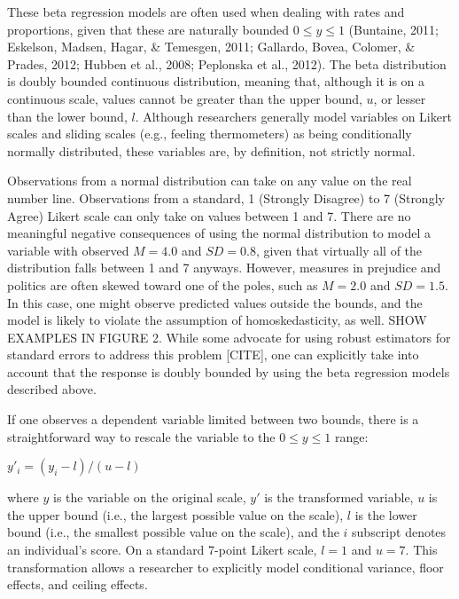 \documentclass[english,man]{apa6}
\theoremstyle{definition}
\theoremstyle{definition}
\theoremstyle{remark}
\begin{document}
These beta regression models are often used when dealing with rates and
proportions, given that these are naturally bounded \(0 \leq y \leq 1\)
(Buntaine, 2011; Eskelson, Madsen, Hagar, \& Temesgen, 2011; Gallardo,
Bovea, Colomer, \& Prades, 2012; Hubben et al., 2008; Peplonska et al.,
2012). The beta distribution is doubly bounded continuous distribution,
meaning that, although it is on a continuous scale, values cannot be
greater than the upper bound, \(u\), or lesser than the lower bound,
\(l\). Although researchers generally model variables on Likert scales
and sliding scales (e.g., feeling thermometers) as being conditionally
normally distributed, these variables are, by definition, not strictly
normal.

Observations from a normal distribution can take on any value on the
real number line. Observations from a standard, 1 (Strongly Disagree) to
7 (Strongly Agree) Likert scale can only take on values between 1 and 7.
There are no meaningful negative consequences of using the normal
distribution to model a variable with observed \(M = 4.0\) and
\(SD = 0.8\), given that virtually all of the distribution falls between
1 and 7 anyways. However, measures in prejudice and politics are often
skewed toward one of the poles, such as \(M = 2.0\) and \(SD = 1.5\). In
this case, one might observe predicted values outside the bounds, and
the model is likely to violate the assumption of homoskedasticity, as
well. SHOW EXAMPLES IN FIGURE 2. While some advocate for using robust
estimators for standard errors to address this problem {[}CITE{]}, one
can explicitly take into account that the response is doubly bounded by
using the beta regression models described above.

If one observes a dependent variable limited between two bounds, there
is a straightforward way to rescale the variable to the
\(0 \leq y \leq 1\) range:

\begin{center}
$y'_i = (y_i - l) / (u - l)$
\end{center}

where \(y\) is the variable on the original scale, \(y'\) is the
transformed variable, \(u\) is the upper bound (i.e., the largest
possible value on the scale), \(l\) is the lower bound (i.e., the
smallest possible value on the scale), and the \(i\) subscript denotes
an individual's score. On a standard 7-point Likert scale, \(l = 1\) and
\(u = 7\). This transformation allows a researcher to explicitly model
conditional variance, floor effects, and ceiling effects.
\end{document}
